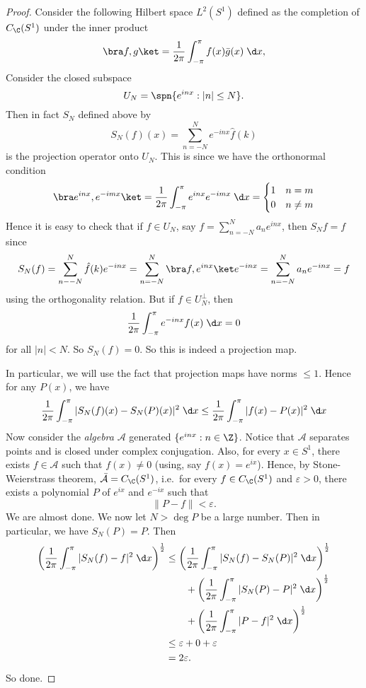 \documentclass[a4paper]{article}
\begin{document}
\begin{proof}
  Consider the following Hilbert space $L^2(S^1)$ defined as the completion of $C_{\C}(S^1)$ under the inner product
  \[
    \bra f, g\ket = \frac{1}{2\pi} \int_{-\pi}^\pi f(x) \bar{g}(x) \;\d x,
  \]
  Consider the closed subspace
  \[
    U_N = \spn \{e^{inx}: |n| \leq N\}.
  \]
  Then in fact $S_N$ defined above by
  \[
    S_N(f)(x) = \sum_{n = -N}^N e^{-inx} \hat{f}(k)
  \]
  is the projection operator onto $U_N$. This is since we have the orthonormal condition
  \[
    \bra e^{inx}, e^{-imx}\ket = \frac{1}{2\pi} \int_{-\pi}^\pi e^{inx}e^{-imx}\;\d x =
    \begin{cases}
      1 & n = m\\
      0 & n \not= m
    \end{cases}
  \]
  Hence it is easy to check that if $f \in U_N$, say $f = \sum_{n = -N}^N a_n e^{inx}$, then $S_N f = f$ since
  \[
    S_N (f) = \sum_{n - -N}^N \hat{f}(k) e^{-inx} = \sum_{n = -N}^N \bra f, e^{inx}\ket e^{-inx} = \sum_{n = -N}^N a_n e^{-inx} = f
  \]
  using the orthogonality relation. But if $f \in U_N^\perp$, then
  \[
    \frac{1}{2\pi} \int_{-\pi}^\pi e^{-inx} f(x)\;\d x = 0
  \]
  for all $|n| < N$. So $S_N(f) = 0$. So this is indeed a projection map.

  In particular, we will use the fact that projection maps have norms $\leq 1$. Hence for any $P(x)$, we have
  \[
    \frac{1}{2\pi}\int_{-\pi}^\pi |S_N(f)(x) - S_N(P)(x)|^2 \;\d x \leq \frac{1}{2\pi} \int_{-\pi}^\pi |f(x) - P(x)|^2 \;\d x
  \]
  Now consider the \emph{algebra} $\mathcal{A}$ generated $\{e^{inx}: n \in \Z\}$. Notice that $\mathcal{A}$ separates points and is closed under complex conjugation. Also, for every $x \in S^1$, there exists $f \in \mathcal{A}$ such that $f(x) \not= 0$ (using, say $f(x) = e^{ix}$). Hence, by Stone-Weierstrass theorem, $\bar{\mathcal{A}} = C_\C(S^1)$, i.e.\ for every $f \in C_\C (S^1)$ and $\varepsilon > 0$, there exists a polynomial $P$ of $e^{ix}$ and $e^{-ix}$ such that
  \[
    \|P - f\| < \varepsilon.
  \]
  We are almost done. We now let $N > \deg P$ be a large number. Then in particular, we have $S_N(P) = P$. Then
  \begin{align*}
    \left(\frac{1}{2\pi} \int_{-\pi}^\pi |S_N(f) - f|^2 \;\d x\right)^{\frac{1}{2}} &\leq \left(\frac{1}{2\pi}\int_{-\pi}^\pi |S_N(f) - S_N(P)|^2 \;\d x\right)^{\frac{1}{2}} \\
    &\quad \quad+ \left(\frac{1}{2\pi} \int_{-\pi}^\pi |S_N(P) - P|^2 \;\d x\right)^{\frac{1}{2}}\\
    &\quad \quad+ \left(\frac{1}{2\pi} \int_{-\pi}^\pi |P - f|^2 \;\d x\right)^{\frac{1}{2}}\\
    &\leq \varepsilon + 0 + \varepsilon\\
    &= 2\varepsilon.
  \end{align*}
  So done.
\end{proof}
\end{document}

